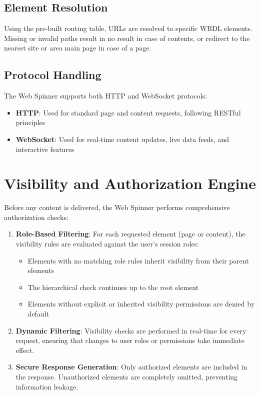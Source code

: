 \subsection{Element Resolution}
Using the pre-built routing table, URLs are resolved to specific WBDL elements. Missing or invalid paths result in no result in case of contents, or redirect to the nearest site or area main page in case of a page.

\subsection{Protocol Handling}
The Web Spinner supports both HTTP and WebSocket protocols:
\begin{itemize}
\item \textbf{HTTP}: Used for standard page and content requests, following RESTful principles
\item \textbf{WebSocket}: Used for real-time content updates, live data feeds, and interactive features
\end{itemize}

\section{Visibility and Authorization Engine}

Before any content is delivered, the Web Spinner performs comprehensive authorization checks:

\begin{enumerate}
\item \textbf{Role-Based Filtering}: For each requested element (page or content), the visibility rules are evaluated against the user's session roles:
\begin{itemize}
\item Elements with no matching role rules inherit visibility from their parent elements
\item The hierarchical check continues up to the root element
\item Elements without explicit or inherited visibility permissions are denied by default
\end{itemize}

\item \textbf{Dynamic Filtering}: Visibility checks are performed in real-time for every request, ensuring that changes to user roles or permissions take immediate effect.

\item \textbf{Secure Response Generation}: Only authorized elements are included in the response. Unauthorized elements are completely omitted, preventing information leakage.
\end{enumerate}

